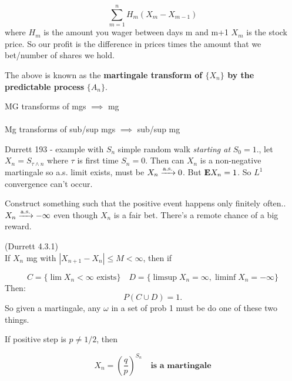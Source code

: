 \documentclass{article}
\begin{document}
$$\sum_{m=1}^n H_m (X_m - X_{m-1}) $$
where  $H_m$ is the amount you wager between days m and m+1 $X_m$ is the stock price. So our profit is the difference in prices times the amount that we bet/number of shares we hold. 

The above is known as the \textbf{martingale transform of $\{X_n\}$ by the predictable process }$\{A_n\}$. 

\begin{fact}
MG transforms of mgs $\implies$ mg\\\\
Mg transforms of sub/sup mgs $\implies$ sub/sup mg 
\end{fact}


\begin{example}
Durrett 193 - example with $S_n$ simple random walk \textit{starting at} $S_0 = 1$., let $X_n = S_{\tau\wedge n}$ where $\tau$ is first time $S_n = 0$. Then can $X_n$ is a non-negative martingale so a.s. limit exists, must be $X_n\xrightarrow{\mathrm{a.s.}} 0$. But $\mathbf{E} X_n =1$. So $L^1$ convergence can't occur. 
\end{example}

\begin{example}
Construct something such that the positive event happens only finitely often.. $X_n\xrightarrow{\mathrm{a.s.}} -\infty$ even though $X_n$ is a fair bet. There's a remote chance of a big reward. 
\end{example}

\begin{theorem}
(Durrett 4.3.1) \\If $X_n$ mg with $|X_{n+1} - X_n| \leq M<\infty$, then if 

$$C = \{ \lim X_n<\infty \text{ exists}\} \quad D = \{\limsup X_n =\infty, \liminf X_n =-\infty\}$$
Then:
$$P(C\cup D) = 1.$$
So given a martingale, any $\omega$ in a set of prob 1 must be do one of these two things.
\end{theorem}

\begin{example}
If positive step is $p\neq 1/2$, then 

$$X_n = \left(\frac{q}{p}\right)^{S_n} \quad \textbf{is a martingale}$$
\end{example}

\begin{theorem}
\end{theorem}
\end{document}
